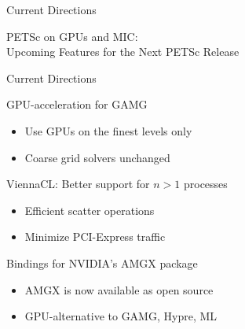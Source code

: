 


\begin{frame}{Current Directions}
  \begin{center}
    \Large PETSc on GPUs and MIC: \\[1em] Upcoming Features for the Next PETSc Release \\[1em]
  \end{center}
\end{frame}




\begin{frame}{Current Directions}

  \begin{block}{GPU-acceleration for GAMG}
    \begin{itemize}
     \item Use GPUs on the finest levels only
     \item Coarse grid solvers unchanged
    \end{itemize}
  \end{block}

  \begin{block}{ViennaCL: Better support for $n>1$ processes}
    \begin{itemize}
     \item Efficient scatter operations
     \item Minimize PCI-Express traffic
    \end{itemize}
  \end{block}

  \begin{block}{Bindings for NVIDIA's AMGX package}
    \begin{itemize}
     \item AMGX is now available as open source
     \item GPU-alternative to GAMG, Hypre, ML
    \end{itemize}
  \end{block}

\end{frame}



